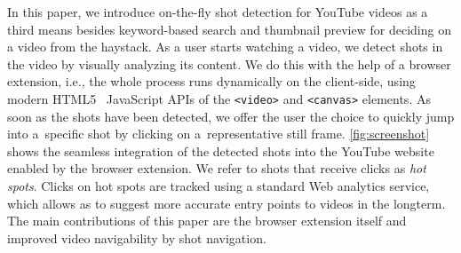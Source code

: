 \documentclass{acm_proc_article-sp}
\begin{document}

In this paper, we introduce on-the-fly shot detection for YouTube videos as a third means besides keyword-based search and thumbnail preview for deciding on a video from the haystack. As a user starts watching a video, we detect shots in the video by visually analyzing its content. We do this with the help of a browser extension, i.e., the whole process runs dynamically on the client-side, using modern HTML5~\cite{w3c_html5} JavaScript APIs of the \texttt{<video>} and \texttt{<canvas>} elements. As soon as the shots have been detected, we offer the user the choice to quickly jump into a~specific shot by clicking on a~representative still frame. \autoref{fig:screenshot} shows the seamless integration of the detected shots into the YouTube website enabled by the browser extension. We refer to shots that receive clicks as \emph{hot spots}. Clicks on hot spots are tracked using a standard Web analytics service, which allows as to suggest more accurate entry points to videos in the longterm. The main contributions of this paper are the browser extension itself and improved video navigability by shot navigation.

\end{document}
